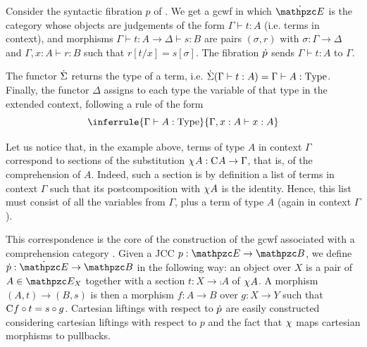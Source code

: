 \documentclass{lmcs} %
\theoremstyle{plain}\newtheorem{satz}[thm]{Satz} %
\begin{document}
\begin{exa} 
\label{ex:gcwfsyntax} 
				Consider the syntactic fibration $p$ of . We get a gcwf in which $\tcat{\ct{E}}$ is the category whose objects are judgements of the form $\Gamma \vdash t:A$ (i.e. terms in context), and morphisms $\Gamma \vdash t:A \to \Delta \vdash s:B$ are pairs $(\sigma, r)$ with $\sigma:\Gamma\to\Delta$ and $\Gamma, x:A\vdash r:B$ such that $r[t/x]=s[\sigma]$. The fibration $\dot{p}$ sends $\Gamma \vdash t:A$ to $\Gamma$. 
				
				The functor $\dot{\Sigma}$ returns the type of a term, i.e. $\dot{\Sigma}(\Gamma \vdash t:A)= \Gamma \vdash A:\mathrm{Type}$. Finally, the functor $\Delta$ assigns to each type the variable of that type in the extended context, following a rule of the form 
				\[\inferrule{\Gamma\vdash A:\type}{\Gamma, \var{A}:A\vdash \var{A}:A}\]
			\end{exa}


Let us notice that, in the example above, terms of type $A$ in context $\Gamma$ correspond to sections of the substitution $\chi^{}A : \mathrm{C}^{}A \to \Gamma$, that is, of the comprehension of $A$. 
Indeed, such a section is by definition 
a list of terms in context $\Gamma$ such that its postcomposition with $\chi^{}A$ is the identity. 
Hence, this list must consist of all the variables from $\Gamma$, plus a term of type $A$ (again in context $\Gamma$). 

This correspondence is the core of the construction of the gcwf associated with a comprehension category \cite{emmenegger}. 
Given a JCC $p:\ct{E}\to\ct{B}$, we define $\tfib{p}:\tcat{\ct{E}}\to \ct{B}$ in the following way:
			an object over $X$ is a pair of $A\in\fibre{\ct{E}}{X}$ together with a section $t:X\to \comp{}A$ of $\chi^{}A$. A morphism $(A,t)\to(B,s)$ is then a morphism $f:A\to B$ over $g:X\to Y$ such that $\mathrm{C}^{}f\circ t=s\circ g$. Cartesian liftings with respect to $\dot{p}$ are easily constructed considering cartesian liftings with respect to $p$ and the fact that $\chi^{}$ maps cartesian morphisms to pullbacks.
			
\end{document}
